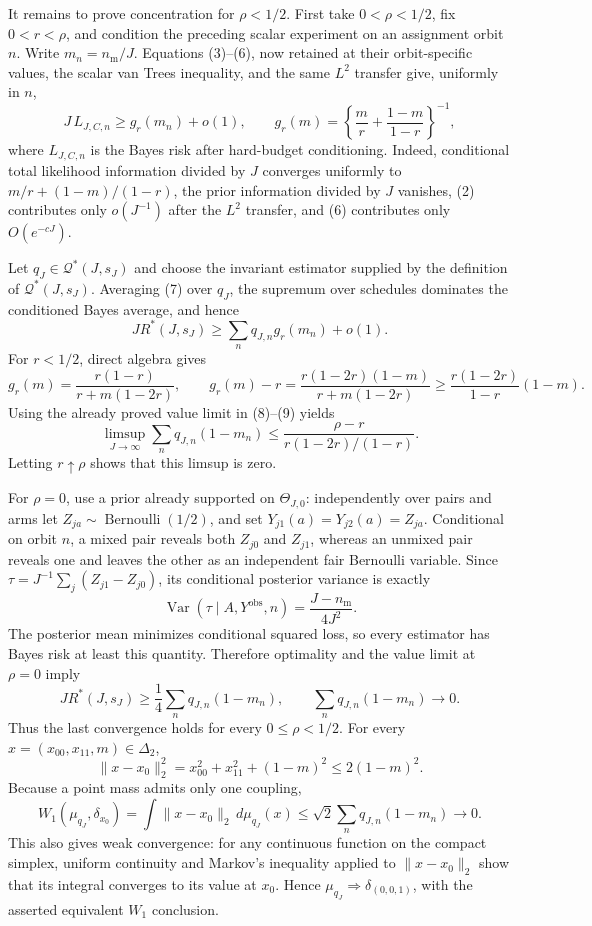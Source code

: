 It remains to prove concentration for \(\rho<1/2\).  First take \(0<\rho<1/2\), fix \(0<r<\rho\), and condition the preceding scalar experiment on an assignment orbit \(n\).  Write \(m_n=n_{\mathrm m}/J\).  Equations (3)--(6), now retained at their orbit-specific values, the scalar van Trees inequality, and the same \(L^2\) transfer give, uniformly in \(n\),
\[
 J\,L_{J,C,n}\ge g_r(m_n)+o(1),
 \qquad
 g_r(m)=\left\{\frac m r+\frac{1-m}{1-r}\right\}^{-1},
 \tag{7}
\]
where \(L_{J,C,n}\) is the Bayes risk after hard-budget conditioning.  Indeed, conditional total likelihood information divided by \(J\) converges uniformly to \(m/r+(1-m)/(1-r)\), the prior information divided by \(J\) vanishes, (2) contributes only \(o(J^{-1})\) after the \(L^2\) transfer, and (6) contributes only \(O(e^{-cJ})\).

Let \(q_J\in\mathcal Q^*(J,s_J)\) and choose the invariant estimator supplied by the definition of \(\mathcal Q^*(J,s_J)\).  Averaging (7) over \(q_J\), the supremum over schedules dominates the conditioned Bayes average, and hence
\[
 J R^*(J,s_J)
 \ge \sum_nq_{J,n}g_r(m_n)+o(1).
 \tag{8}
\]
For \(r<1/2\), direct algebra gives
\[
 g_r(m)
 =\frac{r(1-r)}{r+m(1-2r)},
 \qquad
 g_r(m)-r
 =\frac{r(1-2r)(1-m)}{r+m(1-2r)}
 \ge \frac{r(1-2r)}{1-r}(1-m).
 \tag{9}
\]
Using the already proved value limit in (8)--(9) yields
\[
 \limsup_{J\to\infty}
 \sum_nq_{J,n}(1-m_n)
 \le
 \frac{\rho-r}{r(1-2r)/(1-r)}.
\]
Letting \(r\uparrow\rho\) shows that this limsup is zero.

For \(\rho=0\), use a prior already supported on \(\Theta_{J,0}\): independently over pairs and arms let \(Z_{ja}\sim\operatorname{Bernoulli}(1/2)\), and set \(Y_{j1}(a)=Y_{j2}(a)=Z_{ja}\).  Conditional on orbit \(n\), a mixed pair reveals both \(Z_{j0}\) and \(Z_{j1}\), whereas an unmixed pair reveals one and leaves the other as an independent fair Bernoulli variable.  Since
\(
 \tau=J^{-1}\sum_j(Z_{j1}-Z_{j0})
\), its conditional posterior variance is exactly
\[
 \operatorname{Var}(\tau\mid A,Y^{\mathrm{obs}},n)
 =\frac{J-n_{\mathrm m}}{4J^2}.
\]
The posterior mean minimizes conditional squared loss, so every estimator has Bayes risk at least this quantity.  Therefore optimality and the value limit at \(\rho=0\) imply
\[
 J R^*(J,s_J)
 \ge\frac14\sum_nq_{J,n}(1-m_n),
 \qquad
 \sum_nq_{J,n}(1-m_n)\longrightarrow0.
 \tag{10}
\]
Thus the last convergence holds for every \(0\le\rho<1/2\).  For every \(x=(x_{00},x_{11},m)\in\Delta_2\),
\[
 \|x-x_0\|_2^2=x_{00}^2+x_{11}^2+(1-m)^2
 \le2(1-m)^2.
\]
Because a point mass admits only one coupling,
\[
 W_1(\mu_{q_J},\delta_{x_0})
 =\int\|x-x_0\|_2\,d\mu_{q_J}(x)
 \le\sqrt2\sum_nq_{J,n}(1-m_n)\longrightarrow0.
\]
This also gives weak convergence: for any continuous function on the compact simplex, uniform continuity and Markov's inequality applied to \(\|x-x_0\|_2\) show that its integral converges to its value at \(x_0\).  Hence \(\mu_{q_J}\Rightarrow\delta_{(0,0,1)}\), with the asserted equivalent \(W_1\) conclusion.

